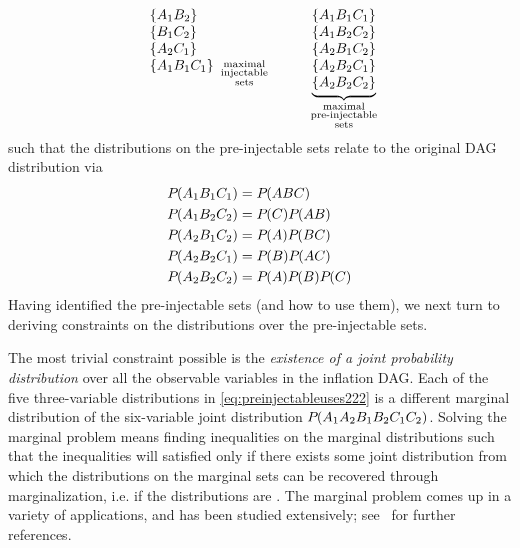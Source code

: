 \begin{align}
{{\begin{array}{l}
\left\lbrace A_1 B_2\right\rbrace\\
\left\lbrace B_1 C_2\right\rbrace\\
\left\lbrace A_2 C_1\right\rbrace\\
\left\lbrace A_1 B_1 C_1\right\rbrace
\end{array}}_{\substack{\text{maximal}\\\text{injectable}\\\text{sets}}}}
\qquad\quad
{\underbrace{\begin{matrix}
\\
\left\lbrace A_1 B_1 C_1\right\rbrace \\
\left\lbrace A_1 B_2 C_2\right\rbrace \\
\left\lbrace A_2 B_1 C_2\right\rbrace \\
\left\lbrace A_2 B_2 C_1\right\rbrace \\
\left\lbrace A_2 B_2 C_2\right\rbrace
\end{matrix}}_{\substack{\text{maximal}\\\text{pre-injectable}\\\text{sets}}}}
\end{align}
such that the distributions on the pre-injectable sets relate to the original DAG distribution via
\begin{align}\label{eq:preinjectableuses222}
\begin{split}
&{P_{}}\lparen A_1 B_1 C_1\rparen = {P_{}}\lparen A B C\rparen \\
&{P_{}}\lparen A_1 B_2 C_2\rparen = {P_{}}\lparen C\rparen{P_{}}\lparen A B\rparen\\
&{P_{}}\lparen A_2 B_1 C_2\rparen = {P_{}}\lparen A\rparen{P_{}}\lparen B C\rparen\\
&{P_{}}\lparen A_2 B_2 C_1\rparen = {P_{}}\lparen B\rparen{P_{}}\lparen A C\rparen\\
&{P_{}}\lparen A_2 B_2 C_2\rparen = {P_{}}\lparen A\rparen{P_{}}\lparen B\rparen{P_{}}\lparen C\rparen
\end{split}
\end{align}
Having identified the pre-injectable sets (and how to use them), we next turn to deriving constraints on the distributions over the pre-injectable sets.


\label{step:marginalsproblem}\par\smallskip\nobreak

The most trivial constraint possible 
is the \emph{existence of a joint probability distribution} over all the observable variables in the inflation DAG. Each of the five three-variable distributions in \cref{eq:preinjectableuses222} is a different marginal distribution of the six-variable joint distribution ${P_{}}\lparen A_1 A_2 B_1 B_2 C_1 C_2\rparen$. Solving the marginal problem means finding inequalities on the marginal distributions such that the inequalities will satisfied only if there exists some joint distribution from which the distributions on the marginal sets can be recovered through marginalization, i.e. if the distributions are . The marginal problem comes up in a variety of applications, and has been studied extensively; see~\cite{fritz2013marginal} for further references.  

